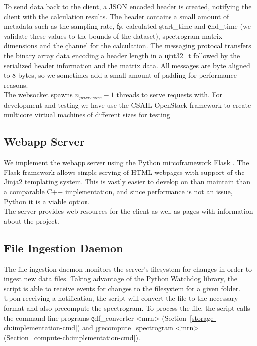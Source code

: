 To send data back to the client, a JSON encoded header is created, notifying
the client with the calculation results. The header contains a small amount of
metadata such as the sampling rate, \c{fs}, calculated \c{start\_time} and
\c{end\_time} (we validate these values to the bounds of the dataset),
spectrogram matrix dimensions and the \c{channel} for the calculation.  The
messaging protocal transfers the binary array data encoding a header length in
a \c{uint32\_t} followed by the serialized header information and the matrix
data. All messages are byte aligned to 8 bytes, so we sometimes add a small
amount of padding for performance reasons. \\

The websocket spawns $n_{processors} - 1$ threads to serve requests with. For
development and testing we have use the CSAIL OpenStack framework to create
multicore virtual machines of different sizes for testing.

\subsection{Webapp Server}\label{compute-ch:implementation-webapp}

We implement the webapp server using the Python mircoframework Flask
\cite{flask}. The Flask framework allows simple serving of HTML webpages with
support of the Jinja2 \cite{jinja2} templating system. This is vastly easier to
develop on than maintain than a comparable C++ implementation, and since
performance is not an issue, Python it is a viable option. \\

The server provides web resources for the client as well as pages with
information about the project.

\subsection{File Ingestion Daemon}

The file ingestion daemon monitors the server's filesystem for changes in order
to ingest new data files. Taking advantage of the Python Watchdog
\cite{watchdog} library, the script is able to receive events for changes to
the filesystem for a given folder. Upon receiving a notification, the script
will convert the file to the necessary format and also precompute the
spectrogram. To process the file, the script calls the command line programs
\c{edf\_converter <mrn>} (Section~\ref{storage-ch:implementation-cmd}) and
\c{precompute\_spectrogram <mrn>}
(Section~\ref{compute-ch:implementation-cmd}). \\

